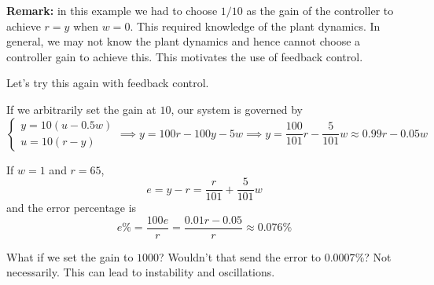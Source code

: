 \documentclass[12pt]{article}
\newcommand*{\tbf}[1]{\ifmmode\mathbf{#1}\else\textbf{#1}\fi}
\begin{document}
\tbf{Remark:} in this example we had to choose $1/10$ as the gain of the controller to achieve $r = y$ when $w = 0$. This required knowledge of the plant dynamics. In general, we may not know the plant dynamics and hence cannot choose a controller gain to achieve this. This motivates the use of feedback control.

Let's try this again with feedback control. 

\begin{center}
\end{center}

If we arbitrarily set the gain at $10$, our system is governed by 
\[\begin{cases}
    y = 10 (u - 0.5 w)\\ 
    u = 10(r - y)
\end{cases} \implies y = 100r - 100y - 5w \implies y = \frac{100}{101}r  - \frac{5}{101}w \approx 0.99r - 0.05w\]

If $w=1$ and $r = 65$,
\[e = y -r = \frac{r}{101} + \frac{5}{101}w\]
and the error percentage is 
\[e\% = \frac{100e}{r} = \frac{0.01r - 0.05}{r} \approx 0.076\% \]

What if we set the gain to $1000$? Wouldn't that send the error to $0.0007\%$? Not necessarily. This can lead to instability and oscillations. 
\end{document}
